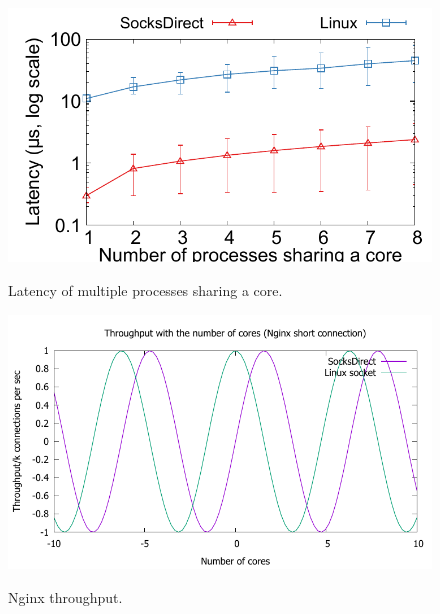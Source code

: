 \begin{figure}[t!]
\begin{minipage}{.32\textwidth}
		\centering \includegraphics[width=\textwidth]{eval/microbenchmark/sharecore-lat.pdf}
		\vspace{-15pt}
		\label{fig:eval-context-switch}
		\caption{Latency of multiple processes sharing a core.}
	\end{minipage}
	\begin{minipage}{.32\textwidth}
		\centering
		\includegraphics[width=\textwidth]{eval/microbenchmark/nginx-short-tput.pdf}
		\vspace{-15pt}
		\label{fig:eval-nginx-short}
		\caption{Nginx throughput.}
		

\end{minipage}
\end{figure}
